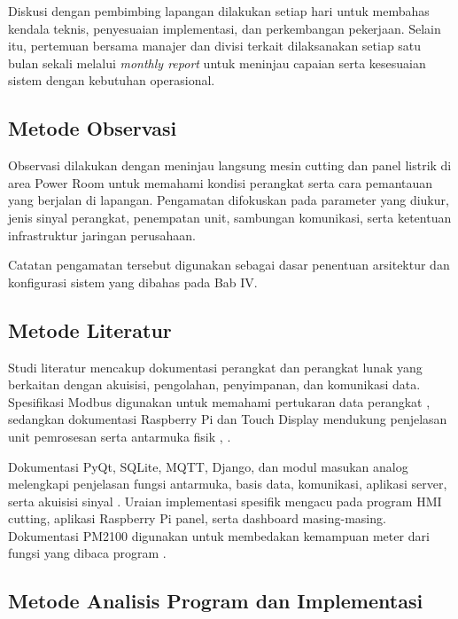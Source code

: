 Diskusi dengan pembimbing lapangan dilakukan setiap hari untuk membahas kendala teknis, penyesuaian implementasi, dan perkembangan pekerjaan. Selain itu, pertemuan bersama manajer dan divisi terkait dilaksanakan setiap satu bulan sekali melalui \textit{monthly report} untuk meninjau capaian serta kesesuaian sistem dengan kebutuhan operasional.

\subsection{Metode Observasi}

Observasi dilakukan dengan meninjau langsung mesin cutting dan panel listrik di area Power Room untuk memahami kondisi perangkat serta cara pemantauan yang berjalan di lapangan. Pengamatan difokuskan pada parameter yang diukur, jenis sinyal perangkat, penempatan unit, sambungan komunikasi, serta ketentuan infrastruktur jaringan perusahaan.

Catatan pengamatan tersebut digunakan sebagai dasar penentuan arsitektur dan konfigurasi sistem yang dibahas pada Bab IV.

\subsection{Metode Literatur}

Studi literatur mencakup dokumentasi perangkat dan perangkat lunak yang berkaitan dengan akuisisi, pengolahan, penyimpanan, dan komunikasi data. Spesifikasi Modbus digunakan untuk memahami pertukaran data perangkat \citep{modbus2012}, sedangkan dokumentasi Raspberry Pi dan Touch Display mendukung penjelasan unit pemrosesan serta antarmuka fisik \citep{raspberrypi}, \citep{touchdisplay}.

Dokumentasi PyQt, SQLite, MQTT, Django, dan modul masukan analog melengkapi penjelasan fungsi antarmuka, basis data, komunikasi, aplikasi server, serta akuisisi sinyal \citep{pyqt,sqlite,mqtt2014,django,waveshare}. Uraian implementasi spesifik mengacu pada program HMI cutting, aplikasi Raspberry Pi panel, serta dashboard masing-masing. Dokumentasi PM2100 digunakan untuk membedakan kemampuan meter dari fungsi yang dibaca program \citep{schneiderpm2100}.

\subsection{Metode Analisis Program dan Implementasi}

